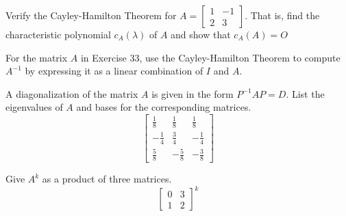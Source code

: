 \documentclass[12pt,letterpaper]{hmcpset}
\begin{document}
\begin{problem}[4.3.33]
    Verify the Cayley-Hamilton Theorem for $A=\begin{bmatrix}
    1 & -1 \\ 
    2 & 3
    \end{bmatrix} $. That is, find the characteristic polynomial $c_A(\lambda)$ of $A$ and show that $c_A(A) = O$
\end{problem}

\begin{solution}
    \vfill
\end{solution}

\newpage

\begin{problem}[4.3.37]
    For the matrix $A$ in Exercise 33, use the Cayley-Hamilton Theorem to compute $A^{-1}$ by expressing it as a linear combination of $I$ and $A$.
\end{problem}

\begin{solution}
    \vfill
\end{solution}

\newpage

\begin{problem}[4.4.7]
    A diagonalization of the matrix $A$ is given in the form $P^{-1}AP=D$. List the eigenvalues of $A$ and bases for the corresponding matrices.
    \[
    \begin{bmatrix}
    \frac{1}{8} & \frac{1}{8} & \frac{1}{8} \\ 
    -\frac{1}{4} & \frac{3}{4} & -\frac{1}{4} \\ 
    \frac{5}{8} & -\frac{5}{8} & -\frac{3}{8}
    \end{bmatrix} 
    \]
\end{problem}

\begin{solution}
    \vfill
\end{solution}

\newpage

\begin{problem}[4.4.19]
    Give $A^k$ as a product of three matrices.
    \[
    \begin{bmatrix}
    0 & 3 \\ 
    1 & 2
    \end{bmatrix}^k
    \]
\end{problem}
\end{document}
